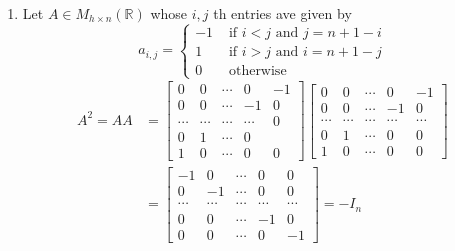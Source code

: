 \documentclass[11pt]{article}
\begin{document}
\begin{enumerate}[{\bf Q1.}]
\begin{enumerate}
			\item 
			Let $A \in M_{h \times n}(\mathbb{R})$ whose $i, j$ th entries ave given by
			$$
			a_{i, j}= \begin{cases}-1 & \text { if } i<j \text { and } j=n+1-i \\ 1 & \text { if } i>j \text { and } i=n+1-j \\ 0 & \text { otherwise }\end{cases}
			$$
			\begin{equation}
				\begin{aligned}
				A^2=A A & =\left[\begin{array}{ccccc}
				0 & 0 & \cdots & 0 & -1 \\
				0 & 0 & \cdots & -1 & 0 \\
				\cdots & \cdots & \cdots & \cdots & 0 \\
				0 & 1 & \cdots & 0 \\
				1 & 0 & \cdots & 0 & 0
				\end{array}\right]\left[\begin{array}{ccccc}
				0 & 0 & \cdots & 0 & -1 \\
				0 & 0 & \cdots & -1 & 0 \\
				\cdots & \cdots & \cdots & \cdots & \cdots \\
				0 & 1 & \cdots & 0 & 0 \\
				1 & 0 & \cdots & 0 & 0
				\end{array}\right] \\
				& =\left[\begin{array}{ccccc}
				-1 & 0 & \cdots & 0 & 0 \\
				0 & -1 & \cdots & 0 & 0 \\
				\cdots & \cdots & \cdots & \cdots & \cdots \\
				0 & 0 & \cdots & -1 & 0 \\
				0 & 0 & \cdots & 0 & -1
				\end{array}\right]=-I_n
				\end{aligned}
				\end{equation}

		\end{enumerate}
	\end{enumerate}
\end{document}
